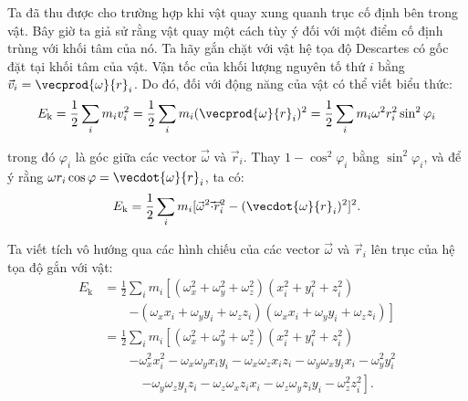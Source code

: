 Ta đã thu được  cho trường hợp khi vật quay xung quanh trục cố định bên trong vật. Bây giờ ta giả sử rằng vật quay một cách tùy ý đối với một điểm cố định trùng với khối tâm của nó. Ta hãy gắn chặt với vật hệ tọa độ Descartes có gốc đặt tại khối tâm của vật. Vận tốc của khối lượng nguyên tố thứ $i$ bằng $\vec{v}_i=\vecprod{\omega}{r}_i$. Do đó, đối với động năng của vật có thể viết biểu thức:
\begin{equation*}
	E_{\text{k}} = \frac{1}{2}\sum_i m_iv_i^2 = \frac{1}{2}\sum_i m_i (\vecprod{\omega}{r}_i)^2 = \frac{1}{2}\sum_i m_i \omega^2 r_i^2\sin^2\varphi_i
\end{equation*}

\noindent
trong đó $\varphi_i$ là góc giữa các vector $\vec{\omega}$ và $\vec{r}_i$. Thay $1-\cos^2\varphi_i$ bằng $\sin^2\varphi_i$, và để ý rằng $\omega r_i\cos\varphi=\vecdot{\omega}{r}_i$, ta có:
\begin{equation*}
	E_{\text{k}} = \frac{1}{2}\sum_i m_i [\vec{\omega}^2\vec{\cdot}\vec{r}_i^2 - (\vecdot{\omega}{r}_i)^2]^2.
\end{equation*}

\noindent
Ta viết tích vô hướng qua các hình chiếu của các vector $\vec{\omega}$ và $\vec{r}_i$ lên trục của hệ tọa độ gắn với vật:
\begin{align*}
	E_{\text{k}} &= \frac{1}{2}\sum_i m_i \left[(\omega_x^2+\omega_y^2+\omega_z^2)(x_i^2+y_i^2+z_i^2) \right.\\
	&\quad\quad\left. - (\omega_x x_i+\omega_y y_i+\omega_z z_i)(\omega_x x_i+\omega_y y_i+\omega_z z_i)\right]\\
	&= \frac{1}{2}\sum_i m_i \left[(\omega_x^2+\omega_y^2+\omega_z^2)(x_i^2+y_i^2+z_i^2)  \right.\\
	&\quad\quad\left. -\omega_x^2x_i^2 - \omega_x\omega_yx_iy_i - \omega_x\omega_zx_iz_i - \omega_y\omega_xy_ix_i - \omega_y^2y_i^2   \right.\\
	&\quad\quad\quad\left. - \omega_y\omega_zy_iz_i - \omega_z\omega_xz_ix_i - \omega_z\omega_yz_iy_i - \omega_z^2z_i^2\right].
\end{align*}

